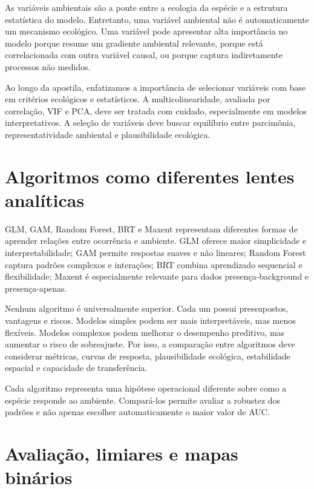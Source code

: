 \documentclass{ueap-sdm}
\begin{document}
As variáveis ambientais são a ponte entre a ecologia da espécie e a estrutura estatística do modelo. Entretanto, uma variável ambiental não é automaticamente um mecanismo ecológico. Uma variável pode apresentar alta importância no modelo porque resume um gradiente ambiental relevante, porque está correlacionada com outra variável causal, ou porque captura indiretamente processos não medidos.

Ao longo da apostila, enfatizamos a importância de selecionar variáveis com base em critérios ecológicos e estatísticos. A multicolinearidade, avaliada por correlação, VIF e PCA, deve ser tratada com cuidado, especialmente em modelos interpretativos. A seleção de variáveis deve buscar equilíbrio entre parcimônia, representatividade ambiental e plausibilidade ecológica.

\section{Algoritmos como diferentes lentes analíticas}

GLM, GAM, Random Forest, BRT e Maxent representam diferentes formas de aprender relações entre ocorrência e ambiente. GLM oferece maior simplicidade e interpretabilidade; GAM permite respostas suaves e não lineares; Random Forest captura padrões complexos e interações; BRT combina aprendizado sequencial e flexibilidade; Maxent é especialmente relevante para dados presença-background e presença-apenas.

Nenhum algoritmo é universalmente superior. Cada um possui pressupostos, vantagens e riscos. Modelos simples podem ser mais interpretáveis, mas menos flexíveis. Modelos complexos podem melhorar o desempenho preditivo, mas aumentar o risco de sobreajuste. Por isso, a comparação entre algoritmos deve considerar métricas, curvas de resposta, plausibilidade ecológica, estabilidade espacial e capacidade de transferência.

\begin{conceito}[title={\faBook\quad Algoritmos são hipóteses operacionais}]
	Cada algoritmo representa uma hipótese operacional diferente sobre como a espécie responde ao ambiente. Compará-los permite avaliar a robustez dos padrões e não apenas escolher automaticamente o maior valor de AUC.
\end{conceito}

\section{Avaliação, limiares e mapas binários}
\end{document}
